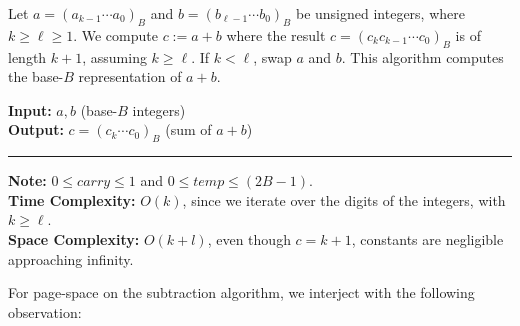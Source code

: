 \begin{Func}
    Let $a = (a_{k-1} \cdots a_0)_B$ and $b = (b_{\ell-1} \cdots b_0)_B$ be unsigned integers, where $k \geq \ell \geq 1$. We compute $c := a + b$ where the result $c = (c_{k}c_{k-1} \cdots c_0)_B$ is of length $k+1$, assuming $k \geq \ell$. If $k < \ell$, swap $a$ and $b$. This algorithm computes the base-$B$ representation of $a + b$.

    \vspace{.5em}
    \noindent
    \textbf{Input:} $a, b$ (base-$B$ integers)\\
    \textbf{Output:} $c = (c_k \cdots c_0)_B$ (sum of $a + b$)\\

    \begin{algorithm}[H]
        \SetAlgoLined
    \end{algorithm}
    \noindent\rule{\textwidth}{0.4pt}

    \noindent
    \textbf{Note:} $0\leq \textit{carry} \leq 1$ and $0\leq \textit{temp}\leq(2B-1)$.\\
    \textbf{Time Complexity:} $O(k)$, since we iterate over the digits of the integers, with $k \geq \ell$.\\
    \textbf{Space Complexity:} $O(k+l)$, even though $c=k+1$, constants are negligible approaching infinity.
\end{Func}

\noindent
For page-space on the subtraction algorithm, we interject with the following observation:

